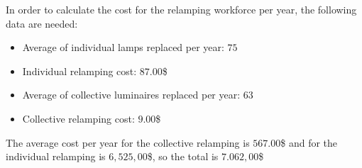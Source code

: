 In order to calculate the cost for the relamping workforce per year, the following data are needed:
\begin{itemize}
\item Average of individual lamps replaced per year: $75$
\item Individual relamping cost: $87.00$\$
\item Average of collective luminaires replaced per year: $63$
\item Collective relamping cost: $9.00$\$
\end{itemize}

The average cost per year for the collective relamping is $567.00$\$ and for the individual relamping is $6,525,00$\$, so the total is $7.062,00$\$

